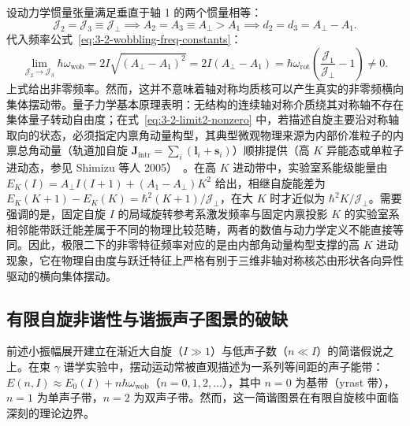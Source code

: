 设动力学惯量张量满足垂直于轴 1 的两个惯量相等：
\begin{equation}\label{eq:3-2-limit2-def}
\mathcal{J}_2 = \mathcal{J}_3 \equiv \mathcal{J}_\perp \implies A_2 = A_3 \equiv A_\perp > A_1 \implies d_2 = d_3 = A_\perp - A_1.
\end{equation}
代入频率公式~\eqref{eq:3-2-wobbling-freq-constants}：
\begin{equation}\label{eq:3-2-limit2-nonzero}
\lim_{\mathcal{J}_2 \to \mathcal{J}_3} \hbar \omega_{\text{wob}} = 2I \sqrt{(A_\perp - A_1)^2} = 2I (A_\perp - A_1) = \hbar \omega_{\text{rot}} \left( \frac{\mathcal{J}_1}{\mathcal{J}_\perp} - 1 \right) \ne 0.
\end{equation}
上式给出非零频率。然而，这并不意味着轴对称均质核可以产生真实的非零频横向集体摆动带。量子力学基本原理表明：无结构的连续轴对称介质绕其对称轴不存在集体量子转动自由度；在式~\eqref{eq:3-2-limit2-nonzero} 中，若描述自旋主要沿对称轴取向的状态，必须指定内禀角动量构型，其典型微观物理来源为内部价准粒子的内禀总角动量（轨道加自旋 $\mathbf{J}_{\text{intr}} = \sum_i (\mathbf{l}_i + \mathbf{s}_i)$）顺排提供（高 $K$ 异能态或单粒子进动态，参见 Shimizu 等人 2005）~\cite{shimizu-2005-high-k-precession}。在高 $K$ 进动带中，实验室系能级能量由 $E_K(I) = A_\perp I(I+1) + (A_1 - A_\perp) K^2$ 给出，相继自旋能差为 $E_K(K+1) - E_K(K) = \hbar^2 (K+1) / \mathcal{J}_\perp$，在大 $K$ 时才近似为 $\hbar^2 K / \mathcal{J}_\perp$。需要强调的是，固定自旋 $I$ 的局域旋转参考系激发频率与固定内禀投影 $K$ 的实验室系相邻能带跃迁能差属于不同的物理比较范畴，两者的数值与动力学定义不能直接等同。因此，极限二下的非零特征频率对应的是由内部角动量构型支撑的高 $K$ 进动现象，它在物理自由度与跃迁特征上严格有别于三维非轴对称核芯由形状各向异性驱动的横向集体摆动。

\subsection{有限自旋非谐性与谐振声子图景的破缺}\label{sec:3-2-5}

前述小振幅展开建立在渐近大自旋（$I \gg 1$）与低声子数（$n \ll I$）的简谐假说之上。在束 $\gamma$ 谱学实验中，摆动运动常被直观描述为一系列等间距的声子能带：$E(n, I) \approx E_0(I) + n \hbar \omega_{\text{wob}}$（$n = 0, 1, 2, \dots$），其中 $n=0$ 为基带（yrast 带），$n=1$ 为单声子带，$n=2$ 为双声子带。然而，这一简谐图景在有限自旋核中面临深刻的理论边界。

